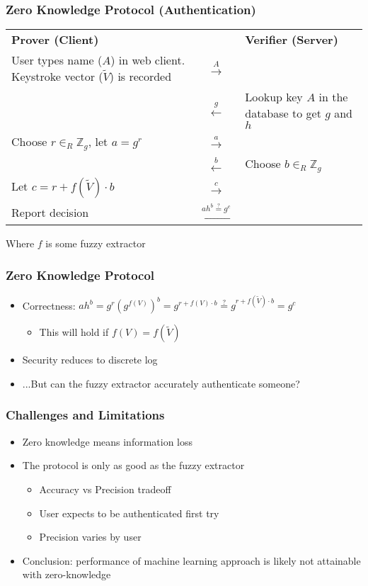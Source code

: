 \documentclass{beamer}
\begin{document}
\frame
{
  \frametitle{Zero Knowledge Protocol (Authentication)}

  \begin{center}
\begin{tabular}{m{1.5in}cm{1.5in}}
\textbf{Prover (Client)} && \textbf{Verifier (Server)}\\
User types name ($A$) in web client. Keystroke vector ($\tilde V$) is recorded &$\stackrel{A}{\longrightarrow}$ & \\
&$\stackrel{g}\longleftarrow$ & Lookup key $A$ in the database to get $g$ and $h$\\
Choose $r\in_R\mathbb{Z}_g$, let $a = g^r$ & $\stackrel{a}\longrightarrow$ & \\
& $\stackrel{b}\longleftarrow$ & Choose $b\in_R\mathbb{Z}_g$ \\
Let $c = r + f(\tilde V)\cdot b$ & $\stackrel{c}\longrightarrow$ & \\
Report decision & $\stackrel{ah^b \stackrel{?}{=} g^c}\longleftarrow$ &
\end{tabular}
\end{center}
Where $f$ is some fuzzy extractor
}

\frame
{
  \frametitle{Zero Knowledge Protocol}
  \begin{itemize}
    \item<1->Correctness: $ah^b = g^r(g^{f(V)})^b = g^{r+f(V)\cdot b} \stackrel?= g^{r+f(\tilde V)\cdot b} = g^c$
    \begin{itemize}
      \item<2-> This will hold if $f(V) = f(\tilde V)$
    \end{itemize}
    \item<3-> Security reduces to discrete log
    \item<4-> ...But can the fuzzy extractor accurately authenticate someone?
  \end{itemize}

}
\frame
{
  \frametitle{Challenges and Limitations}
  \begin{itemize}
    \item<1-> Zero knowledge means information loss  
    \item<2-> The protocol is only as good as the fuzzy extractor
    \begin{itemize}
      \item<3-> Accuracy vs Precision tradeoff
      \item<4-> User expects to be authenticated first try
      \item<5-> Precision varies by user
    \end{itemize}
    \item<6->Conclusion: performance of machine learning approach is likely not attainable with zero-knowledge
  \end{itemize}

}

\end{document}
